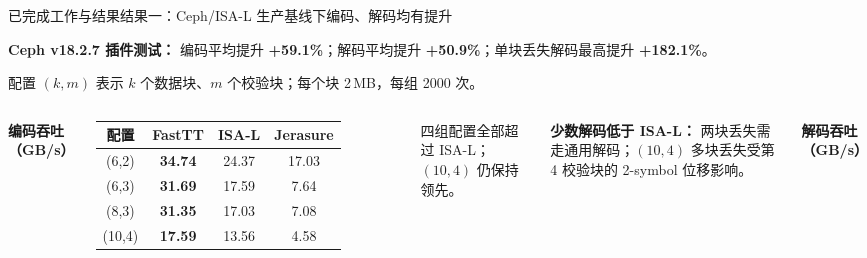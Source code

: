 
\begin{frame}[t]{已完成工作与结果}{结果一：Ceph/ISA-L 生产基线下编码、解码均有提升}

    \vspace{-0.55em}
    {\scriptsize\textbf{Ceph v18.2.7 插件测试：}
    编码平均提升 \textbf{+59.1\%}；解码平均提升 \textbf{+50.9\%}；单块丢失解码最高提升 \textbf{+182.1\%}。}

    \vspace{0.15em}
    {\tiny 配置 $(k,m)$ 表示 $k$ 个数据块、$m$ 个校验块；每个块 2\,MB，每组 2000 次。}

    \vspace{0.15em}
    \begin{columns}[T,onlytextwidth]
        \centering
        \scriptsize\textbf{编码吞吐（GB/s）}

        \vspace{0.15em}
        \scriptsize
        \setlength{\tabcolsep}{2.5pt}
        \renewcommand{\arraystretch}{1.05}
        \begin{tabular}{cccc}
            \toprule
            配置 & FastTT & ISA-L & Jerasure \\
            \midrule
            (6,2)  & \textbf{34.74} & 24.37 & 17.03 \\
            (6,3)  & \textbf{31.69} & 17.59 & 7.64  \\
            (8,3)  & \textbf{31.35} & 17.03 & 7.08  \\
            (10,4) & \textbf{17.59} & 13.56 & 4.58  \\
            \bottomrule
        \end{tabular}

        \vspace{0.35em}
        {\tiny 四组配置全部超过 ISA-L；$(10,4)$ 仍保持领先。}

        \vspace{0.35em}
        \begin{minipage}{0.98\textwidth}
            \tiny\raggedright
            \textbf{少数解码低于 ISA-L：}
            两块丢失需走通用解码；$(10,4)$ 多块丢失受第 4 校验块的 2-symbol 位移影响。
        \end{minipage}

        \centering
        \scriptsize\textbf{解码吞吐（GB/s）}


\end{columns}
\end{frame}
